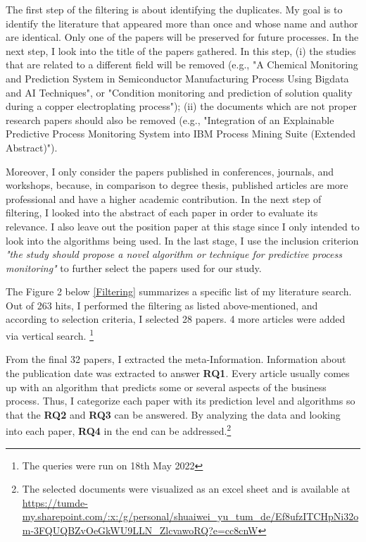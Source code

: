 \documentclass[runningheads]{llncs}
\begin{document}
		The first step of the filtering is about identifying the duplicates. My goal is to identify the literature that appeared more than once and whose name and author are identical. Only one of the papers will be preserved for future processes. In the next step, I look into the title of the papers gathered. In this step, (i) the studies that are related to a different field will be removed (e.g., "A Chemical Monitoring and Prediction System in Semiconductor Manufacturing Process Using Bigdata and AI Techniques", or "Condition monitoring and prediction of solution quality during a copper electroplating process"); (ii) the documents which are not proper research papers should also be removed (e.g., "Integration of an Explainable Predictive Process Monitoring System into IBM Process Mining Suite (Extended Abstract)").
				
		Moreover, I only consider the papers published in conferences, journals, and workshops, because, in comparison to degree thesis, published articles are more professional and have a higher academic contribution. In the next step of filtering, I looked into the abstract of each paper in order to evaluate its relevance. I also leave out the position paper at this stage since I only intended to look into the algorithms being used. In the last stage, I use the inclusion criterion \textit{"the study should propose a novel algorithm or technique for predictive process monitoring"} to further select the papers used for our study.
		
		The Figure 2 below \ref{Filtering} summarizes a specific list of my literature search. Out of 263 hits, I performed the filtering as listed above-mentioned, and according to selection criteria, I selected 28 papers. 4 more articles were added via vertical search. \footnote{The queries were run on 18th May 2022}
		
		From the final 32 papers, I extracted the meta-Information. Information about the publication date was extracted to answer \textbf{RQ1}. Every article usually comes up with an algorithm that predicts some or several aspects of the business process. Thus, I categorize each paper with its prediction level and algorithms so that the \textbf{RQ2} and \textbf{RQ3} can be answered. By analyzing the data and looking into each paper, \textbf{RQ4} in the end can be addressed.\footnote{The selected documents were visualized as an excel sheet and is available at \url{https://tumde-my.sharepoint.com/:x:/g/personal/shuaiwei_yu_tum_de/Ef8ufzITCHpNi32om-3FQUQBZvOeGkWU9LLN_ZlcvawoRQ?e=cc8cnW} }
		
\end{document}
